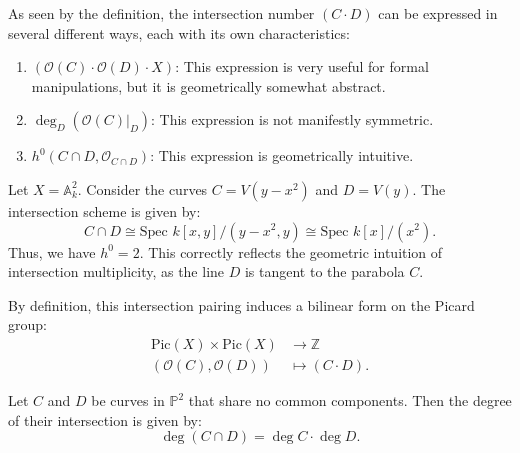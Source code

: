 \begin{remark}[20.2.4]
As seen by the definition, the intersection number $(C \cdot D)$ can be expressed in several different ways, each with its own characteristics:
\begin{enumerate}
    \item $(\mathcal{O}(C) \cdot \mathcal{O}(D) \cdot X)$: This expression is very useful for formal manipulations, but it is geometrically somewhat abstract.
    \item $\deg_D(\mathcal{O}(C)|_D)$: This expression is not manifestly symmetric.
    \item $h^0(C \cap D, \mathcal{O}_{C \cap D})$: This expression is geometrically intuitive.
\end{enumerate}
\end{remark}

\begin{example}
Let $X = \mathbb{A}^2_k$. Consider the curves $C = V(y - x^2)$ and $D = V(y)$. The intersection scheme is given by:
\[
C \cap D \cong \text{Spec } k[x,y]/(y - x^2, y) \cong \text{Spec } k[x]/(x^2).
\]
Thus, we have $h^0 = 2$. This correctly reflects the geometric intuition of intersection multiplicity, as the line $D$ is tangent to the parabola $C$.
\end{example}

By definition, this intersection pairing induces a bilinear form on the Picard group:
\begin{align*}
\text{Pic}(X) \times \text{Pic}(X) &\longrightarrow \mathbb{Z} \\
(\mathcal{O}(C), \mathcal{O}(D)) &\longmapsto (C \cdot D).
\end{align*}

\begin{theorem}
Let $C$ and $D$ be curves in $\mathbb{P}^2$ that share no common components. Then the degree of their intersection is given by:
\[
\deg(C \cap D) = \deg C \cdot \deg D.
\]
\end{theorem}

